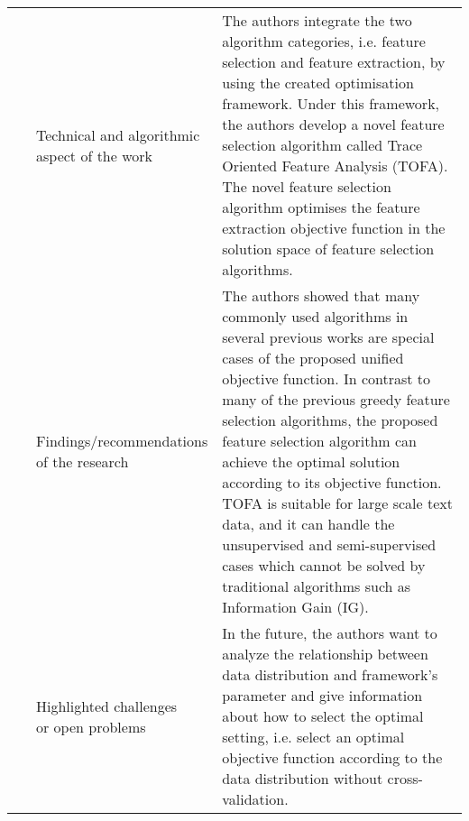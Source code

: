 \begin{landscape}
\begin{longtable}{lp{}p{}}
	\multirow{3}[0]{*}{~\citep{Yan2008}} & 
    \specialcell{Technical and algorithmic \\ aspect of the work} &
    The authors integrate the two algorithm categories, i.e. feature selection and feature extraction, by using the created optimisation framework. Under this framework, the authors develop a novel feature selection algorithm called Trace Oriented Feature Analysis (TOFA).  The novel feature selection algorithm optimises the feature extraction objective function in the solution space of feature selection algorithms.     
    \\ & 
    \specialcell{Findings/recommendations \\ of the research} & 
	The authors showed that many commonly used algorithms in several previous works are special cases of the proposed unified objective function.  In contrast to many of the previous greedy feature selection algorithms, the proposed feature selection algorithm can achieve the optimal solution according to its objective function. TOFA is suitable for large scale text data, and it can handle the unsupervised and semi-supervised cases which cannot be solved by traditional algorithms such as Information Gain (IG).
    \\ & 
    \specialcell{Highlighted challenges \\ or open problems} & 
    In the future, the authors want to analyze the relationship between data distribution and framework's parameter and give information about how to select the optimal setting, i.e. select an optimal objective function according to the data distribution without cross-validation.
	\\
	

\end{longtable}
\end{landscape}
